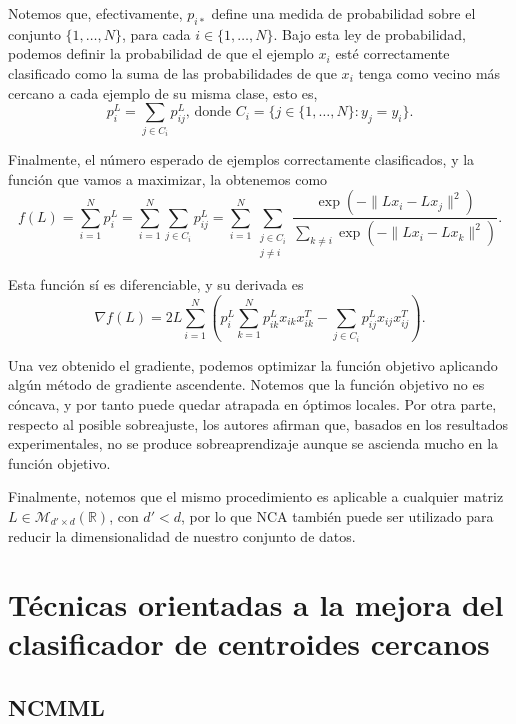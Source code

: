Notemos que, efectivamente, $p_{i*}$ define una medida de probabilidad sobre el conjunto $\{1,\dots,N\}$, para cada $i \in \{1,\dots,N\}$. Bajo esta ley de probabilidad, podemos definir la probabilidad de que el ejemplo $x_i$ esté correctamente clasificado como la suma de las probabilidades de que $x_i$ tenga como vecino más cercano a cada ejemplo de su misma clase, esto es,
\begin{equation}
    p_i^L = \sum_{j \in C_i} p_{ij}^L \text{, donde } C_i = \{j \in \{1,\dots,N\}\colon y_j = y_i\}.
\end{equation}

Finalmente, el número esperado de ejemplos correctamente clasificados, y la función que vamos a maximizar, la obtenemos como
\begin{equation}
    f(L) = \sum_{i=1}^N p_i^L = \sum_{i=1}^N \sum_{j \in C_i} p_{ij}^L = \sum_{i=1}^N \sum_{\substack{j \in C_i \\ j \ne i}} \frac{\exp\left(-\|Lx_i - Lx_j \|^2\right)}{\sum\limits_{k \ne i} \exp\left( -\|Lx_i - Lx_k\|^2 \right)}.
\end{equation}

Esta función sí es diferenciable, y su derivada es
\begin{equation}
   \nabla f(L) = 2L \sum_{i=1}^N \left( p_i^L \sum_{k=1}^N p_{ik}^L x_{ik}x_{ik}^T - \sum_{j \in C_i} p_{ij}^Lx_{ij}x_{ij}^T \right).
\end{equation}

Una vez obtenido el gradiente, podemos optimizar la función objetivo aplicando algún método de gradiente ascendente. Notemos que la función objetivo no es cóncava, y por tanto puede quedar atrapada en óptimos locales. Por otra parte, respecto al posible sobreajuste, los autores afirman que, basados en los resultados experimentales, no se produce sobreaprendizaje aunque se ascienda mucho en la función objetivo.

Finalmente, notemos que el mismo procedimiento es aplicable a cualquier matriz $L \in \mathcal{M}_{d'\times d}(\mathbb{R})$, con $d' < d$, por lo que NCA también puede ser utilizado para reducir la dimensionalidad de nuestro conjunto de datos.


\section{Técnicas orientadas a la mejora del clasificador de centroides cercanos}

\subsection{NCMML}

